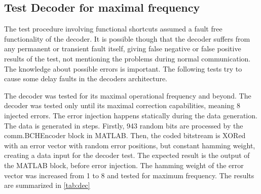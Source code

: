 \subsection{Test Decoder for maximal frequency}

The test procedure involving functional shortcuts assumed a fault free functionality of the decoder. It is possible though that the decoder suffers from any permanent or transient fault itself, giving false negative or false positive results of the test, not mentioning the problems during normal communication. The knowledge about possible errors is important. The following tests try to cause some delay faults in the decoders architecture.

The decoder was tested for its maximal operational frequency and beyond. The decoder was tested only until its maximal correction capabilities, meaning 8 injected errors. The error injection happens statically during the data generation. The data is generated in steps. Firstly, 943 random bits are processed by the comm.BCHEncoder block in MATLAB. Then, the coded bitstream is XORed with an error vector with random error positions, but constant hamming weight, creating a data input for the decoder test. The expected result is the output of the MATLAB block, before error injection. The hamming weight of the error vector was increased from 1 to 8 and tested for maximum frequency. The results are summarized in \autoref{tab:dec}

